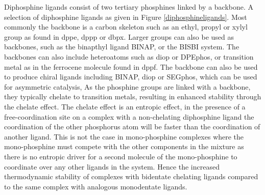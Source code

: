 Diphosphine ligands consist of two tertiary phosphines linked by a backbone.  A selection of diphosphine ligands as given in Figure \ref{diphosphineligands}.  Most commonly the backbone is a carbon skeleton such as an ethyl, propyl or xylyl group as found in \gls{dppe}, \gls{dppp} or \gls{dbpx}.  Larger groups can also be used as backbones, such as the binapthyl ligand \gls{BINAP}, or the \gls{BISBI} system.  The backbones can also include heteroatoms such as \gls{diop} or \gls{DPEphos}, or transition metal as in the ferrocene molecule found in \gls{dppf}.  The backbone can also be used to produce chiral ligands including \gls{BINAP}, \gls{diop} or \gls{SEGphos}, which can be used for asymmetric catalysis, As the phosphine groups are linked with a backbone, they typically chelate to transition metals, resulting in enhanced stability through the chelate effect.  The chelate effect is an entropic effect, in the presence of a free-coordination site on a complex with a non-chelating diphosphine ligand the coordination of the other phosphorus atom will be faster than the coordination of another ligand.\cite{Housecroft2005}  This is not the case in mono-phosphine complexes where the mono-phosphine must compete with the other components in the mixture as there is no entropic driver for a second molecule of the mono-phosphine to coordinate over any other ligands in the system.  Hence the increased thermodynamic stability of complexes with bidentate chelating ligands compared to the same complex with analogous monodentate ligands.  

